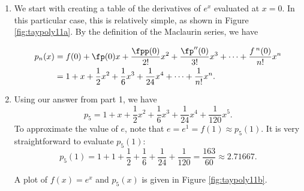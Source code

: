 {\begin{enumerate}
\item We start with creating a table of the derivatives of $e^x$ evaluated at $x=0$. In this particular case, this is relatively simple, as shown in Figure \ref{fig:taypoly11a}.
By the definition of the Maclaurin series, we have 

\begin{align*}
p_n(x) &= f(0) + \fp(0)x + \frac{\fpp(0)}{2!}x^2+\frac{\fp''(0)}{3!}x^3+\cdots+\frac{f\,^n(0)}{n!}x^n\\
			&= 1+x+\frac{1}{2}x^2+\frac{1}{6}x^3 + \frac{1}{24}x^4 + \cdots + \frac{1}{n!}x^n.
\end{align*}

\item	Using our answer from part 1, we have $$p_5 = 1+x+\frac{1}{2}x^2+\frac{1}{6}x^3 + \frac{1}{24}x^4 + \frac{1}{120}x^5.$$ To approximate the value of $e$, note that $e = e^1 = f(1) \approx p_5(1).$ It is very straightforward to evaluate $p_5(1)$:
$$p_5(1) = 1+1+\frac12+\frac16+\frac1{24}+\frac1{120} = \frac{163}{60} \approx 2.71667.$$

A plot of $f(x)=e^x$ and $p_5(x)$ is given in Figure \ref{fig:taypoly11b}.
\end{enumerate}
\baselineskip
}\\

